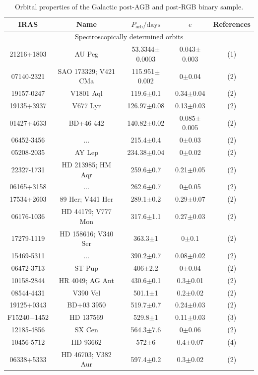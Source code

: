 
\begin{table}
\caption{Orbital properties of the Galactic post-AGB and post-RGB binary sample.}
\label{table:orbits}
\centering
\begin{tabular}{c c c c c}
\hline\hline
IRAS & Name & $P_\mathrm{orb}/\mathrm{days}$ & $e$ & References \\
\hline
\multicolumn{5}{c}{Spectroscopically determined orbits} \\
\hline
21216+1803 & AU Peg & 53.3344$\pm$0.0003 & 0.043$\pm$0.003 & (1) \\
07140-2321 & SAO 173329; V421 CMa & 115.951$\pm$0.002 & 0$\pm$0.04 & (2) \\
19157-0247 & V1801 Aql & 119.6$\pm$0.1 & 0.34$\pm$0.04 & (2) \\
19135+3937 & V677 Lyr & 126.97$\pm$0.08 & 0.13$\pm$0.03 & (2) \\
01427+4633 & BD+46 442 & 140.82$\pm$0.02 & 0.085$\pm$0.005 & (2) \\
06452-3456 & ... & 215.4$\pm$0.4 & 0$\pm$0.03 & (2) \\
05208-2035 & AY Lep & 234.38$\pm$0.04 & 0$\pm$0.02 & (2) \\
22327-1731 & HD 213985; HM Aqr & 259.6$\pm$0.7 & 0.21$\pm$0.05 & (2) \\
06165+3158 & ... & 262.6$\pm$0.7 & 0$\pm$0.05 & (2) \\
17534+2603 & 89 Her; V441 Her & 289.1$\pm$0.2 & 0.29$\pm$0.07 & (2) \\
06176-1036 & HD 44179; V777 Mon & 317.6$\pm$1.1 & 0.27$\pm$0.03 & (2) \\
17279-1119 & HD 158616; V340 Ser & 363.3$\pm$1 & 0$\pm$0.1 & (2) \\
15469-5311 & ... & 390.2$\pm$0.7 & 0.08$\pm$0.02 & (2) \\
06472-3713 & ST Pup & 406$\pm$2.2 & 0$\pm$0.04 & (2) \\
10158-2844 & HR 4049; AG Ant & 430.6$\pm$0.1 & 0.3$\pm$0.01 & (2) \\
08544-4431 & V390 Vel & 501.1$\pm$1 & 0.2$\pm$0.02 & (2) \\
19125+0343 & BD+03 3950 & 519.7$\pm$0.7 & 0.24$\pm$0.03 & (2) \\
F15240+1452 & HD 137569 & 529.8$\pm$1 & 0.11$\pm$0.03 & (3) \\
12185-4856 & SX Cen & 564.3$\pm$7.6 & 0$\pm$0.06 & (2) \\
10456-5712 & HD 93662 & 572$\pm$6 & 0.4$\pm$0.07 & (4) \\
06338+5333 & HD 46703; V382 Aur & 597.4$\pm$0.2 & 0.3$\pm$0.02 & (2) \\

\end{tabular}
\end{table}
